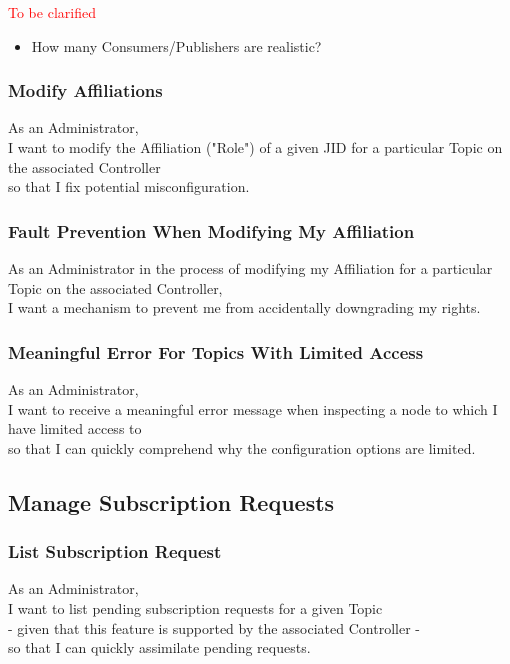 \noindent\textcolor{red}{To be clarified}

\begin{itemize}
    \item How many Consumers/Publishers are realistic?
\end{itemize}


\subsubsection{Modify Affiliations}

As an Administrator,\\
I want to modify the Affiliation ("Role") of a given JID for a particular Topic on the associated Controller \\
so that I fix potential misconfiguration.

\subsubsection{Fault Prevention When Modifying My Affiliation}

As an Administrator in the process of modifying my Affiliation for a particular Topic on the associated Controller,\\
I want a mechanism to prevent me from accidentally downgrading my rights.

\subsubsection{Meaningful Error For Topics With Limited Access}

As an Administrator,\\
I want to receive a meaningful error message when inspecting a node to which I have limited access to \\
so that I can quickly comprehend why the configuration options are limited.

\subsection{Manage Subscription Requests}

\subsubsection{List Subscription Request}
As an Administrator,\\
I want to list pending subscription requests for a given Topic\\
- given that this feature is supported by the associated Controller -\\
so that I can quickly assimilate pending requests.


